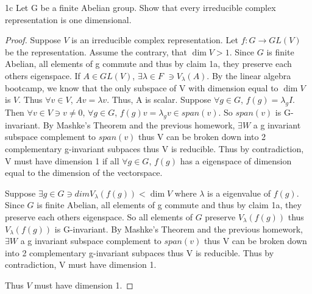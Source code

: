 \documentclass{article}
\begin{document}
\begin{claim}{1c}\label{Claim 1c.}
    Let G be a finite Abelian group. Show that every irreducible complex representation is one dimensional.
\end{claim}
\begin{proof}
    Suppose $V$ is an irreducible complex representation. Let $f: G \to GL(V)$ be the representation. Assume the contrary, that $\dim V > 1$. Since $G$ is finite Abelian, all elements of g commute and thus by claim 1a, they preserve each others eigenspace. If $A \in GL(V)$, $\exists \lambda \in F$ $\ni V_\lambda(A)$. By the linear algebra bootcamp, we know that the only subspace of V with dimension equal to $\dim V$ is $V$. Thus $\forall v \in V$, $Av = \lambda v$. Thus, A is scalar. Suppose $\forall g \in G$, $f(g) = \lambda_g I$. Then $\forall v \in V \ni v \neq 0$, $\forall g \in G $, $f(g)v = \lambda_gv \in span(v)$. So $span(v)$ is G-invariant. By Mashke's Theorem and the previous homework, $\exists W$ a g invariant subspace complement to $span(v)$ thus V can be broken down into 2 complementary g-invariant subpaces thus V is reducible. Thus by contradiction, V must have dimension 1 if all $\forall g \in G$, $f(g)$ has a eigenspace of dimension equal to the dimension of the vectorspace. 
    
    Suppose $\exists g \in G \ni dim V_{\lambda}(f(g))< \dim V$ where $\lambda$ is a eigenvalue of $f(g)$. Since $G$ is finite Abelian, all elements of g commute and thus by claim 1a, they preserve each others eigenspace. So all elements of $G$ preserve $V_{\lambda}(f(g))$ thus $V_{\lambda}(f(g))$ is G-invariant. By Mashke's Theorem and the previous homework, $\exists W$ a g invariant subspace complement to $span(v)$ thus V can be broken down into 2 complementary g-invariant subpaces thus V is reducible. Thus by contradiction, V must have dimension 1. 
    
    Thus $V$ must have dimension 1. 
\end{proof}

\bigskip
\end{document}
